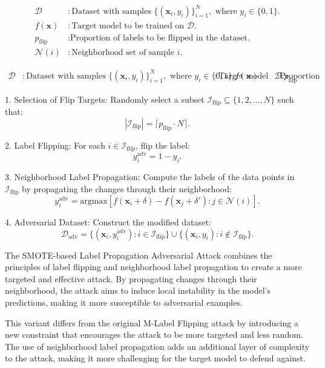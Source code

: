 \[
\begin{aligned}
\mathcal{D} & : \text{Dataset with samples } \{(\mathbf{x}_i, y_i)\}_{i=1}^N, \text{ where } y_i \in \{0, 1\}. \\
f(\mathbf{x}) & : \text{Target model to be trained on } \mathcal{D}. \\
p_{\text{flip}} & : \text{Proportion of labels to be flipped in the dataset.} \\
\mathcal{N}(i) & : \text{Neighborhood set of sample } i.
\end{aligned}
\]

\[
\begin{aligned}
\mathcal{D} & : \text{Dataset with samples } \{(\mathbf{x}_i, y_i)\}_{i=1}^N, \text{ where } y_i \in \{0, 1\}.
f(\mathbf{x}) & : \text{Target model to be trained on } \mathcal{D}.
p_{\text{flip}} & : \text{Proportion of labels to be flipped in the dataset.}
\end{aligned}
\]

1. Selection of Flip Targets:  
   Randomly select a subset $\mathcal{I}_{\text{flip}} \subseteq \{1, 2, \ldots, N\}$ such that:
   \[
   |\mathcal{I}_{\text{flip}}| = \lceil p_{\text{flip}} \cdot N \rceil.
   \]

2. Label Flipping:  
   For each $i \in \mathcal{I}_{\text{flip}}$, flip the label:
   \[
   y_i^{\text{adv}} = 1 - y_i.
   \]

3. Neighborhood Label Propagation:  
   Compute the labels of the data points in $\mathcal{I}_{\text{flip}}$ by propagating the changes through their neighborhood:
   \[
   y_i^{\text{adv}} = \text{argmax} \left[ f(\mathbf{x}_i + \delta) - f(\mathbf{x}_j + \delta') : j \in \mathcal{N}(i) \right].
   \]

4. Adversarial Dataset:  
   Construct the modified dataset:
   \[
   \mathcal{D}_{\text{adv}} = \{(\mathbf{x}_i, y_i^{\text{adv}}) : i \in \mathcal{I}_{\text{flip}}\} \cup \{(\mathbf{x}_i, y_i) : i \notin \mathcal{I}_{\text{flip}}\}.
   \]

The SMOTE-based Label Propagation Adversarial Attack combines the principles of label flipping and neighborhood label propagation to create a more targeted and effective attack. By propagating changes through their neighborhood, the attack aims to induce local instability in the model's predictions, making it more susceptible to adversarial examples.

This variant differs from the original M-Label Flipping attack by introducing a new constraint that encourages the attack to be more targeted and less random. The use of neighborhood label propagation adds an additional layer of complexity to the attack, making it more challenging for the target model to defend against.